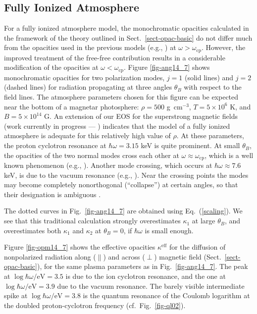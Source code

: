 \documentclass{emulateapj}
\newcommand{\gcc}{\mbox{g cm$^{-3}$}}
\newcommand{\req}[1]{Eq.\ (\ref{#1})}
\newcommand{\omp}{\omega_\mathrm{cp}}
\begin{document}
        \subsection{Fully Ionized Atmosphere}
%
For a fully ionized atmosphere model, the monochromatic opacities 
calculated in the framework of the theory outlined in 
Sect.\ \ref{sect-opac-basic} do not differ much
from the opacities used in the previous models (e.g., 
\citealp{Shib92}) at $\omega > \omp$.
However, the improved treatment of the free-free contribution
results in a considerable modification of the opacities
at $\omega<\omp$. Figure \ref{fig-ang14_7} shows monochromatic
opacities for two polarization modes, $j=1$ (solid lines)
and $j=2$ (dashed lines) 
for radiation propagating at three angles $\theta_B$
with respect to the field lines. 
The atmosphere parameters chosen for this figure can be
expected near the bottom of a magnetar photosphere: 
$\rho=500$ \gcc, $T=5\times10^6$ K, and $B=5\times10^{14}$ G.
An extension of our EOS for the superstrong magnetic fields  
(work currently in progress --- \citealp*{CDP02}) indicates that 
the model of a fully ionized atmosphere is adequate
for this relatively high value of $\rho$.
At these parameters, the proton cyclotron resonance 
at $\hbar\omega=3.15$ keV is quite prominent.
At small $\theta_B$, the opacities of the two normal modes
cross each other at $\omega\approx\omp$, which is a well known
phenomenon (e.g., \citealp{Shib92}).
Another mode crossing, which occurs at
$\hbar\omega\approx7.6$ keV, is due to the vacuum resonance
(e.g., \citealp{Soffel,PavlovGnedin,Shib92}).
Near the crossing points the modes
may become completely nonorthogonal
(``collapse'') at certain angles, 
so that their designation is ambiguous 
\citep{Soffel}. 

The dotted curves in Fig.\ \ref{fig-ang14_7} are obtained
using \req{scaling}. We see that this traditional 
calculation strongly overestimates $\kappa_1$ at large $\theta_B$,
and overestimates both $\kappa_1$ and $\kappa_2$ at $\theta_B=0$,
if $\hbar \omega$ is small enough.

Figure \ref{fig-opm14_7} shows the effective opacities $\kappa^\mathrm{eff}$
for the diffusion of nonpolarized 
radiation along ($\|$) and across ($\perp$)
magnetic field (Sect.\ \ref{sect-opac-basic}),
for the same plasma parameters as in Fig.\ \ref{fig-ang14_7}.
The peak at $\log\hbar\omega/\mbox{eV}=3.5$ 
is due to the ion cyclotron resonance, and the one
at $\log\hbar\omega/\mbox{eV}=3.9$ due to the vacuum resonance.
The barely visible intermediate spike at 
$\log\hbar\omega/\mbox{eV}=3.8$
is the quantum resonance of the Coulomb logarithm
at the doubled proton-cyclotron frequency (cf.\ Fig.\ \ref{fig-ql02}).
\end{document}

